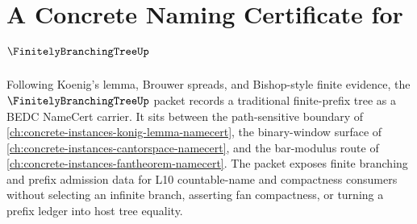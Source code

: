 \chapter{A Concrete Naming Certificate for $\FinitelyBranchingTreeUp$}
\label{ch:concrete-instances-finitely-branching-tree-namecert}

Following Koenig's lemma, Brouwer spreads, and Bishop-style finite evidence, the $\FinitelyBranchingTreeUp$ packet records a traditional finite-prefix tree as a BEDC NameCert carrier. It sits between the path-sensitive boundary of \autoref{ch:concrete-instances-konig-lemma-namecert}, the binary-window surface of \autoref{ch:concrete-instances-cantorspace-namecert}, and the bar-modulus route of \autoref{ch:concrete-instances-fantheorem-namecert}. The packet exposes finite branching and prefix admission data for L10 countable-name and compactness consumers without selecting an infinite branch, asserting fan compactness, or turning a prefix ledger into host tree equality.

